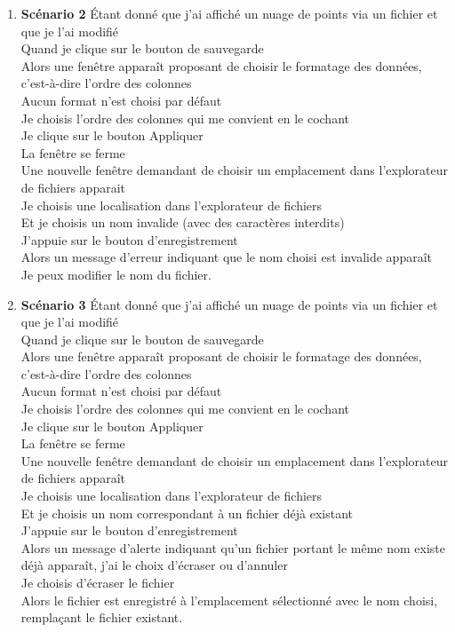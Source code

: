 \documentclass[12pt,titlepage,french]{article}
\begin{document}
\begin{enumerate}
\begin{enumerate}
    \item \textbf{Scénario 2}
Étant donné que j'ai affiché un nuage de points via un fichier et que je l'ai modifié\\
Quand je clique sur le bouton de sauvegarde\\
Alors une fenêtre apparaît proposant de choisir le formatage des données, c'est-à-dire l'ordre des colonnes\\
Aucun format n'est choisi par défaut\\
Je choisis l'ordre des colonnes qui me convient en le cochant\\
Je clique sur le bouton Appliquer\\
La fenêtre se ferme\\
Une nouvelle fenêtre demandant de choisir un emplacement dans l'explorateur de fichiers apparait\\
Je choisis une localisation dans l'explorateur de fichiers\\
Et je choisis un nom invalide (avec des caractères interdits)\\
J'appuie sur le bouton d'enregistrement\\
Alors un message d'erreur indiquant que le nom choisi est invalide apparaît\\
Je peux modifier le nom du fichier.

    \item \textbf{Scénario 3}
Étant donné que j'ai affiché un nuage de points via un fichier et que je l'ai modifié\\
Quand je clique sur le bouton de sauvegarde\\
Alors une fenêtre apparaît proposant de choisir le formatage des données, c'est-à-dire l'ordre des colonnes\\
Aucun format n'est choisi par défaut\\
Je choisis l'ordre des colonnes qui me convient en le cochant\\
Je clique sur le bouton Appliquer\\
La fenêtre se ferme\\
Une nouvelle fenêtre demandant de choisir un emplacement dans l'explorateur de fichiers apparaît\\
Je choisis une localisation dans l'explorateur de fichiers\\
Et je choisis un nom correspondant à un fichier déjà existant\\
J'appuie sur le bouton d'enregistrement\\
Alors un message d'alerte indiquant qu'un fichier portant le même nom existe déjà apparaît, j'ai le choix d'écraser ou d'annuler\\
Je choisis d'écraser le fichier\\
Alors le fichier est enregistré à l'emplacement sélectionné avec le nom choisi, remplaçant le fichier existant.


\end{enumerate}
\end{enumerate}
\end{document}

